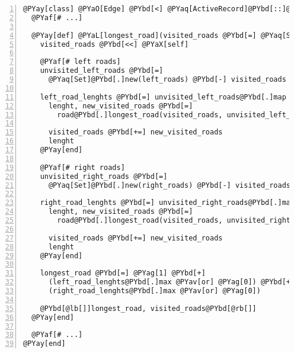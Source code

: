 \begin{Verbatim}[commandchars=@\[\],numbers=left,firstnumber=1,stepnumber=1]
@PYay[class] @PYaO[Edge] @PYbd[<] @PYaq[ActiveRecord]@PYbd[::]@PYaq[Base]
  @PYaf[# ...]

  @PYay[def] @PYaL[longest_road](visited_roads @PYbd[=] @PYaq[Set]@PYbd[.]new, skip_roads @PYbd[=] @PYaq[Set]@PYbd[.]new)
    visited_roads @PYbd[<<] @PYaX[self]

    @PYaf[# left roads]
    unvisited_left_roads @PYbd[=]
      @PYaq[Set]@PYbd[.]new(left_roads) @PYbd[-] visited_roads @PYbd[-] skip_roads

    left_road_lenghts @PYbd[=] unvisited_left_roads@PYbd[.]map @PYay[do] @PYbd[|]road@PYbd[|]
      lenght, new_visited_roads @PYbd[=]
        road@PYbd[.]longest_road(visited_roads, unvisited_left_roads)

      visited_roads @PYbd[+=] new_visited_roads
      lenght
    @PYay[end]

    @PYaf[# right roads]
    unvisited_right_roads @PYbd[=]
      @PYaq[Set]@PYbd[.]new(right_roads) @PYbd[-] visited_roads @PYbd[-] skip_roads

    right_road_lenghts @PYbd[=] unvisited_right_roads@PYbd[.]map @PYay[do] @PYbd[|]road@PYbd[|]
      lenght, new_visited_roads @PYbd[=]
        road@PYbd[.]longest_road(visited_roads, unvisited_right_roads)

      visited_roads @PYbd[+=] new_visited_roads
      lenght
    @PYay[end]

    longest_road @PYbd[=] @PYag[1] @PYbd[+]
      (left_road_lenghts@PYbd[.]max @PYav[or] @PYag[0]) @PYbd[+]
      (right_road_lenghts@PYbd[.]max @PYav[or] @PYag[0])

    @PYbd[@lb[]]longest_road, visited_roads@PYbd[@rb[]]
  @PYay[end]

  @PYaf[# ...]
@PYay[end]
\end{Verbatim}
